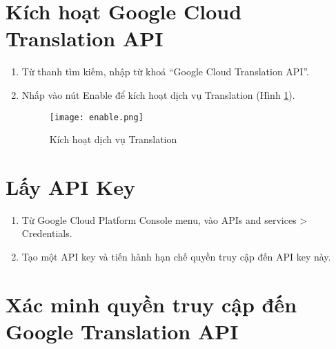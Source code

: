 \documentclass[../thesis.tex]{subfiles}
\begin{document}
\section{Kích hoạt Google Cloud Translation API}
\begin{enumerate}
	\item Từ thanh tìm kiếm, nhập từ khoá ``Google Cloud Translation API''.
	\item Nhấp vào nút Enable để kích hoạt dịch vụ Translation (Hình \ref{Kich hoat dich vu Translation}).
	\begin{figure}
		\texttt{[image: enable.png]}
		\caption{Kích hoạt dịch vụ Translation}
		\label{Kich hoat dich vu Translation}
	\end{figure}
\end{enumerate}

\section{Lấy API Key}
\begin{enumerate}
	\item Từ Google Cloud Platform Console menu, vào APIs and services > Credentials.
	\item Tạo một API key và tiến hành hạn chế quyền truy cập đến API key này.
\end{enumerate}

\section{Xác minh quyền truy cập đến Google Translation API}
\end{document}

